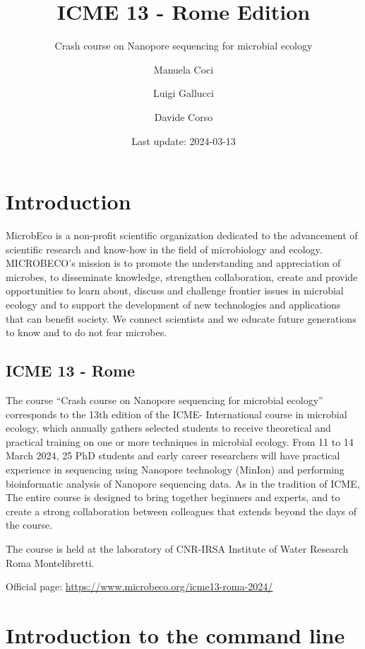 \documentclass[
]{book}
\title{ICME 13 - Rome Edition}
\subtitle{Crash course on Nanopore sequencing for microbial ecology}
\author{Manuela Coci \and Luigi Gallucci \and Davide Corso}
\date{Last update: 2024-03-13}
\begin{document}
\maketitle

{
\setcounter{tocdepth}{1}
\tableofcontents
}
\chapter{Introduction}\label{introduction}

MicrobEco is a non-profit scientific organization dedicated to the advancement of scientific research and know-how in the field of microbiology and ecology. MICROBECO's mission is to promote the understanding and appreciation of microbes, to disseminate knowledge, strengthen collaboration, create and provide opportunities to learn about, discuss and challenge frontier issues in microbial ecology and to support the development of new technologies and applications that can benefit society. We connect scientists and we educate future generations to know and to do not fear microbes.

\section{ICME 13 - Rome}\label{icme-13---rome}

The course ``Crash course on Nanopore sequencing for microbial ecology'' corresponds to the 13th edition of the ICME- International course in microbial ecology, which annually gathers selected students to receive theoretical and practical training on one or more techniques in microbial ecology. From 11 to 14 March 2024, 25 PhD students and early career researchers will have practical experience in sequencing using Nanopore technology (MinIon) and performing bioinformatic analysis of Nanopore sequencing data. As in the tradition of ICME, The entire course is designed to bring together beginners and experts, and to create a strong collaboration between colleagues that extends beyond the days of the course.

The course is held at the laboratory of CNR-IRSA Institute of Water Research Roma Montelibretti.

Official page: \url{https://www.microbeco.org/icme13-roma-2024/}

\chapter{Introduction to the command line}\label{introduction-to-the-command-line}
\end{document}
